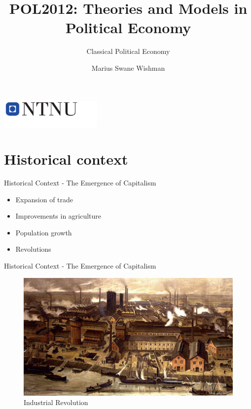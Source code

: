 \documentclass{beamer}
\title{POL2012: Theories and Models in Political Economy}
\subtitle{Classical Political Economy}
\date{}
\author{Marius Swane Wishman}
\institute{Department of Sociology and Political Science}
\begin{document}
\begin{frame}[plain]
\titlepage %
\centering %
\includegraphics[width=5cm]{logo_ntnu_u-slagord.pdf}
\end{frame}


\section{Historical context} %


\begin{frame}{Historical Context - The Emergence of Capitalism}
\begin{itemize}[<+- | alert@+>]
    \item Expansion of trade
    \item Improvements in agriculture
    \item Population growth
    \item Revolutions
\end{itemize}
\end{frame}

\begin{frame}{Historical Context - The Emergence of Capitalism}
    \begin{figure}
        \centering
        \includegraphics[width=\textwidth]{../img/industry.JPG}
        \caption{Industrial Revolution}
    \end{figure}
\end{frame}{}
\end{document}
